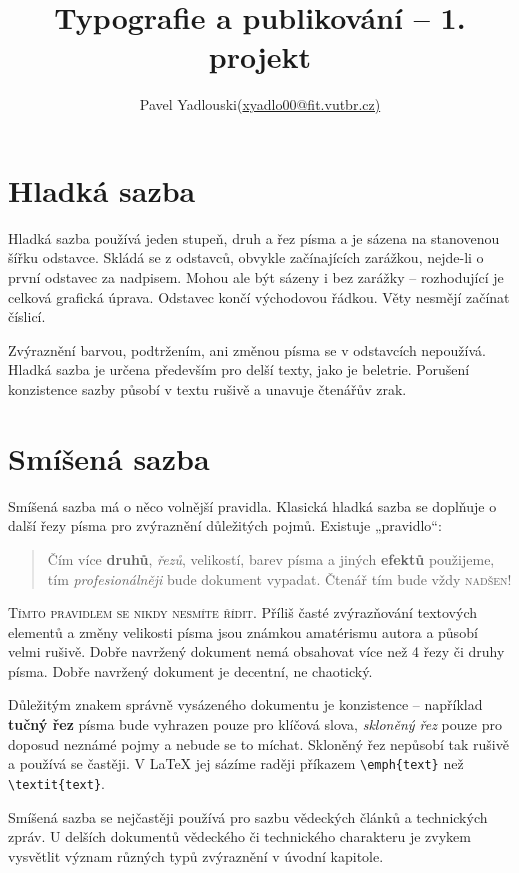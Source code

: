 \documentclass[10pt, a4paper, twocolumn]{article}
\title{Typografie a publikování -- 1. projekt}
\author{Pavel Yadlouski(\href{mailto:xyadlo00@fit.vutbr.cz}{xyadlo00@fit.vutbr.cz)}}
\date{}
\begin{document}
\maketitle
\section {\Large Hladká sazba}
    Hladká sazba používá jeden stupeň, druh a řez písma
    a je sázena na stanovenou šířku odstavce. Skládá se z odstavců, obvykle začínajících zarážkou, nejde-li o první odstavec za nadpisem. Mohou ale být sázeny i bez zarážky –
    rozhodující je celková grafická úprava. Odstavec končí východovou řádkou. Věty nesmějí začínat číslicí. 

    Zvýraznění barvou, podtržením, ani změnou písma se
    v odstavcích nepoužívá. Hladká sazba je určena především
    pro delší texty, jako je beletrie. Porušení konzistence sazby
    působí v textu rušivě a unavuje čtenářův zrak.

\section {{\Large Smíšená sazba}}
    Smíšená sazba má o něco volnější pravidla. Klasická hladká
    sazba se doplňuje o další řezy písma pro zvýraznění důležitých pojmů. Existuje „pravidlo“:
\begin{quote}
    Čím více \textbf{druhů}, \textit{řezů}, {\scriptsize velikostí}, barev písma a jiných {\textbf{\scriptsize{efektů}}} použijeme, tím \textit {profesionálněji} bude dokument vypadat. {\large Čtenář tím bude} {\LARGE {vždy}} {\Huge\textsc {nadšen!}}
\end{quote}

    {\textsc {Tímto pravidlem se nikdy nesmíte řídit}}. Příliš
    časté zvýrazňování textových elementů a změny velikosti
    písma jsou známkou amatérismu autora a působí velmi rušivě. Dobře navržený dokument nemá obsahovat více než
    4 řezy či druhy písma. Dobře navržený dokument je decentní, ne chaotický.

    Důležitým znakem správně vysázeného dokumentu je
    konzistence – například \textbf {tučný řez} písma bude vyhrazen
    pouze pro klíčová slova, \textit{skloněný řez} pouze pro doposud
    neznámé pojmy a nebude se to míchat. Skloněný řez nepůsobí tak rušivě a používá se častěji. V {\LaTeX} jej sázíme
    raději příkazem \verb|\emph{text}| než  \verb|\textit{text}|.
    
    Smíšená sazba se nejčastěji používá pro sazbu vědeckých článků a technických zpráv. U delších dokumentů
    vědeckého či technického charakteru je zvykem vysvětlit
    význam různých typů zvýraznění v úvodní kapitole.
\end{document}
